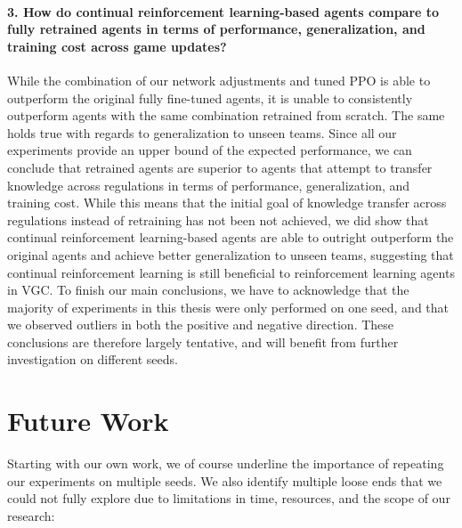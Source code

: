 \paragraph{3. How do continual reinforcement learning-based agents compare to fully retrained agents in terms of performance, generalization, and training cost across game updates?} While the combination of our network adjustments and tuned PPO is able to outperform the original fully fine-tuned agents, it is unable to consistently outperform agents with the same combination retrained from scratch.
The same holds true with regards to generalization to unseen teams.
Since all our experiments provide an upper bound of the expected performance, we can conclude that retrained agents are superior to agents that attempt to transfer knowledge across regulations in terms of performance, generalization, and training cost.
While this means that the initial goal of knowledge transfer across regulations instead of retraining has not been not achieved, we did show that continual reinforcement learning-based agents are able to outright outperform the original agents and achieve better generalization to unseen teams, suggesting that continual reinforcement learning is still beneficial to reinforcement learning agents in VGC.
To finish our main conclusions, we have to acknowledge that the majority of experiments in this thesis were only performed on one seed, and that we observed outliers in both the positive and negative direction.
These conclusions are therefore largely tentative, and will benefit from further investigation on different seeds.

\section{Future Work} \label{sec:futurework}
Starting with our own work, we of course underline the importance of repeating our experiments on multiple seeds.
We also identify multiple loose ends that we could not fully explore due to limitations in time, resources, and the scope of our research:

